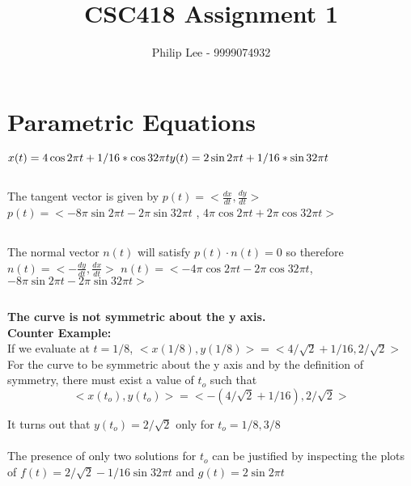 \documentclass[a4paper,10pt]{scrartcl}
\title{CSC418 Assignment 1}
\author{Philip Lee - 9999074932}
\begin{document}
\maketitle


\section{Parametric Equations}
$x(t) = 4\cos{2\pi t} + 1/16 * \cos{32\pi t} \\ y(t) = 2\sin{2\pi t} + 1/16 * \sin{32\pi t}$

\subsection{}

The tangent vector is given by $p(t) = <\frac{dx}{dt}, \frac{dy}{dt}>$\\
$ p(t) = <-8\pi\sin{2\pi t} - 2\pi\sin{32\pi t}$ , $ 4\pi\cos{2\pi t} + 2\pi\cos{32\pi t}>$

\subsection{}

The normal vector $n(t)$ will satisfy $p(t) \cdot n(t) = 0$ so therefore $n(t) = <- \frac{dy}{dt}, \frac{dx}{dt}>$
$ n(t) =  < - 4\pi\cos{2\pi t} - 2\pi\cos{32\pi t}$, $-8\pi\sin{2\pi t} - 2\pi\sin{32\pi t}>$

\subsection{}

{\bfseries The curve is not symmetric about the y axis.}\\

{\bfseries Counter Example:}\\

If we evaluate at $t = 1/8$,  $<x(1/8), y(1/8)> = <4/\sqrt{2} + 1/16, 2/\sqrt{2}>$\\
For the curve to be symmetric about the y axis and by the definition of symmetry,
there must exist a value of $t_o$ such that
\[<x(t_o), y(t_o)> = <-(4/\sqrt{2} + 1/16), 2/\sqrt{2}>\]

It turns out that $y(t_o) = 2/\sqrt{2}$ only for $t_o = 1/8, 3/8$ \\\\
The presence of only two solutions for $t_o$ can be justified by inspecting
the plots of $f(t) = 2/\sqrt{2} - 1/16\sin{32\pi t}$ and $g(t) = 2\sin{2\pi t}$
\end{document}
